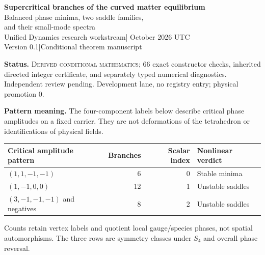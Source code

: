 \documentclass[11pt,a4paper]{article}
\begin{document}
\begin{center}
{\Large\bfseries Supercritical branches of the curved matter equilibrium}\\[8pt]
{\large Balanced phase minima, two saddle families,\\and their small-mode spectra}\\[10pt]
Unified Dynamics research workstream\quad | October 2026 UTC\\
Version 0.1\quad |\quad Conditional theorem manuscript
\end{center}
\begin{abstract}
At the first curved-branch instability, the fixed tetrahedral link--matter model has a three-dimensional critical standard representation. Its inherited matter-relaxed quartic is strictly positive, with positive cubic anisotropy. We reduce the exact analytic stationary energy onto this critical space and prove a complete local scalar bifurcation diagram. Just above threshold, 26 labeled, gauge-inequivalent nonzero branches occur: six balanced phase minima, twelve index-one saddles, and eight index-two saddles. Their amplitudes scale as the square root of the coefficient excess, their energy shifts as its square. A reversing symmetry makes the exact reduced linearization mechanical at these equilibria, giving their instability counts and leading soft frequencies. The six minima remain nonlinearly orbitally stable under every finite-rank embedding by the existing positive color-normal estimate; both saddle families remain unstable through the scalar subsystem. This does not classify all higher-rank equilibria. Energy conservation excludes interpreting the new minima as attractors. All conclusions are conditional on the unchanged candidate action.
\end{abstract}
\textbf{Status.} \textsc{Derived conditional mathematics}; 66 exact constructor checks, inherited directed integer certificate, and separately typed numerical diagnostics. Independent review pending. Development lane, no registry entry; physical promotion $0$.

\textbf{Pattern meaning.} The four-component labels below describe critical phase amplitudes on a fixed carrier. They are not deformations of the tetrahedron or identifications of physical fields.

\begin{center}
\begin{tabular}{lrrl}
\toprule
Critical amplitude pattern & Branches & Scalar index & Nonlinear verdict\\
\midrule
$(1,1,-1,-1)$ & 6 & 0 & Stable minima\\
$(1,-1,0,0)$ & 12 & 1 & Unstable saddles\\
$(3,-1,-1,-1)$ and negatives & 8 & 2 & Unstable saddles\\
\bottomrule
\end{tabular}
\end{center}
Counts retain vertex labels and quotient local gauge/species phases, not spatial automorphisms. The three rows are symmetry classes under $S_4$ and overall phase reversal.
\end{document}
